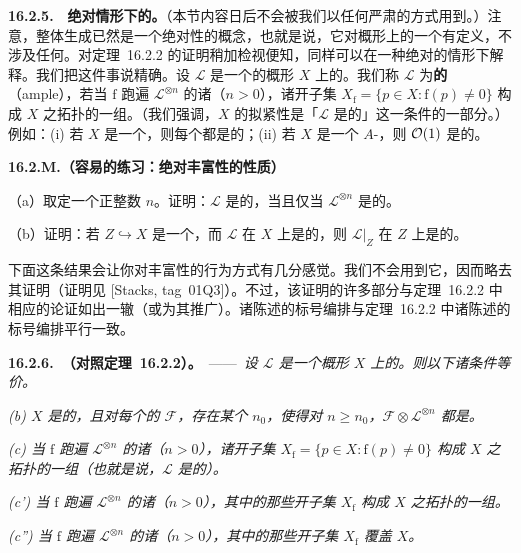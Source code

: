 \textbf{16.2.5.}\ \hard\ \textbf{绝对情形下的\trAmpleness。}\quad （本节内容日后不会被我们以任何严肃的方式用到。）注意，整体生成已然是一个绝对性的概念，也就是说，它对概形上的一个\trQCSheaf{}有定义，不涉及任何\trMorphism。对\mbox{定理~16.2.2} 的证明稍加检视便知，\trAmpleness{}同样可以在一种绝对的情形下解释。我们把这件事说精确。设 $\mathscr{L}$ 是一个\emph{\trQuasicompact}的概形 $X$ 上的\trInvertibleSheaf。我们称 $\mathscr{L}$ 为\textbf{\trAmple{}的}（ample），若当 $\mathrm{f}$ 跑遍 $\mathscr{L}^{\otimes n}$ 的诸\trSection{}（$n>0$），诸开子集 $X_{\mathrm{f}}=\{p\in X:\mathrm{f}(p)\neq 0\}$ 构成 $X$ 之拓扑的一组\trBase。（我们强调，$X$ 的拟紧性是「$\mathscr{L}$ 是\trAmple{}的」这一条件的一部分。）例如：(i) 若 $X$ 是一个\trAffineScheme，则每个\trInvertibleSheaf{}都是\trAmple{}的；(ii) 若 $X$ 是一个\trProjective{} $A$-\trScheme，则 $\mathcal{O}(1)$ 是\trAmple{}的。

\textbf{16.2.M.（容易的练习：绝对丰富性的性质）}\quad

（a）取定一个正整数 $n$。证明：$\mathscr{L}$ 是\trAmple{}的，当且仅当 $\mathscr{L}^{\otimes n}$ 是\trAmple{}的。

（b）证明：若 $Z\hookrightarrow X$ 是一个\trClosedEmbedding，而 $\mathscr{L}$ 在 $X$ 上是\trAmple{}的，则 $\mathscr{L}|_Z$ 在 $Z$ 上是\trAmple{}的。

下面这条结果会让你对丰富性的行为方式有几分感觉。我们不会用到它，因而略去其证明（证明见 [Stacks, tag~01Q3]）。不过，该证明的许多部分与\mbox{定理~16.2.2} 中相应的论证如出一辙（或为其推广）。诸陈述的标号编排与\mbox{定理~16.2.2} 中诸陈述的标号编排平行一致。

\textbf{16.2.6.\ \trhTheorem{}（对照\mbox{定理~16.2.2}）。}\ ——\ \emph{设 $\mathscr{L}$ 是一个\trQuasicompact{}概形 $X$ 上的\trInvertibleSheaf。则以下诸条件等价。}

\emph{(b) $X$ 是\trQuasiSeparated{}的，且对每个\trFiniteType{}的\trQCSheaf{} $\mathscr{F}$，存在某个 $n_0$，使得对 $n\ge n_0$，$\mathscr{F}\otimes\mathscr{L}^{\otimes n}$ 都是\trGloballyGenerated。}

\emph{(c) 当 $\mathrm{f}$ 跑遍 $\mathscr{L}^{\otimes n}$ 的诸\trGlobalSections（$n>0$），诸开子集 $X_{\mathrm{f}}=\{p\in X:\mathrm{f}(p)\neq 0\}$ 构成 $X$ 之拓扑的一组\trBase（也就是说，$\mathscr{L}$ 是\trAmple{}的）。}

\emph{(c') 当 $\mathrm{f}$ 跑遍 $\mathscr{L}^{\otimes n}$ 的诸\trGlobalSections（$n>0$），其中\trAffine{}的那些开子集 $X_{\mathrm{f}}$ 构成 $X$ 之拓扑的一组\trBase。}

\emph{(c'') 当 $\mathrm{f}$ 跑遍 $\mathscr{L}^{\otimes n}$ 的诸\trGlobalSections（$n>0$），其中\trAffine{}的那些开子集 $X_{\mathrm{f}}$ 覆盖 $X$。}

